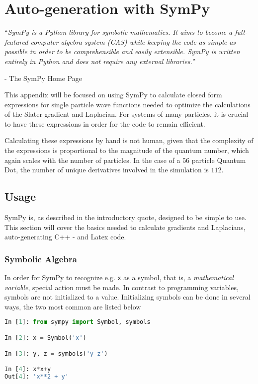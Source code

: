 \chapter{Auto-generation with SymPy}
\label{appendix:sympy}

``\textit{SymPy is a Python library for symbolic mathematics. It aims to become a full-featured computer algebra system (CAS) while keeping the code as simple as possible in order to be comprehensible and easily extensible. SymPy is written entirely in Python and does not require any external libraries.}'' 

\hfill - The SymPy Home Page \cite{SymPy}

\vspace{0.5cm}
This appendix will be focused on using SymPy to calculate closed form expressions for single particle wave functions needed to optimize the calculations of the Slater gradient and Laplacian. For systems of many particles, it is crucial to have these expressions in order for the code to remain efficient. 

Calculating these expressions by hand is not human, given that the complexity of the expressions is proportional to the magnitude of the quantum number, which again scales with the number of particles. In the case of a $56$ particle Quantum Dot, the number of unique derivatives involved in the simulation is $112$. 

\section{Usage}

SymPy is, as described in the introductory quote, designed to be simple to use. This section will cover the basics needed to calculate gradients and Laplacians, auto-generating C++ - and Latex code.

\subsection{Symbolic Algebra}

In order for SymPy to recognize e.g. \verb+x+ as a symbol, that is, a \textit{mathematical variable}, special action must be made. In contrast to programming variables, symbols are not initialized to a value. Initializing symbols can be done in several ways, the two most common are listed below

\vspace{0.25cm}
\begin{lstlisting}[language=Python]
In [1]: from sympy import Symbol, symbols

In [2]: x = Symbol('x')

In [3]: y, z = symbols('y z')

In [4]: x*x+y
Out[4]: 'x**2 + y'

\end{lstlisting}

